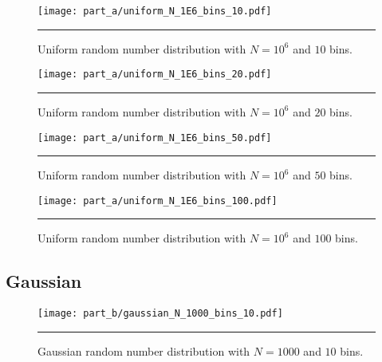 \documentclass[notitlepage,aps,prd,nofootinbib]{revtex4-1}
\begin{document}
\clearpage

\begin{figure}[!htbc]
  \centering
  \texttt{[image: part\_a/uniform\_N\_1E6\_bins\_10.pdf]}
	{\par\nobreak\rule[9pt]{35em}{0.5pt}\vspace{-5mm}}
	\caption{Uniform random number distribution with $N = 10^6$ and $10$ bins.}
	\label{fig:uniform_N_1E6_bins_10}
\end{figure}

\begin{figure}[!htbc]
  \centering
  \texttt{[image: part\_a/uniform\_N\_1E6\_bins\_20.pdf]}
	{\par\nobreak\rule[9pt]{35em}{0.5pt}\vspace{-5mm}}
	\caption{Uniform random number distribution with $N = 10^6$ and $20$ bins.}
	\label{fig:uniform_N_1E6_bins_20}
\end{figure}

\begin{figure}[!htbc]
  \centering
  \texttt{[image: part\_a/uniform\_N\_1E6\_bins\_50.pdf]}
	{\par\nobreak\rule[9pt]{35em}{0.5pt}\vspace{-5mm}}
	\caption{Uniform random number distribution with $N = 10^6$ and $50$ bins.}
	\label{fig:uniform_N_1E6_bins_50}
\end{figure}

\begin{figure}[!htbc]
  \centering
  \texttt{[image: part\_a/uniform\_N\_1E6\_bins\_100.pdf]}
	{\par\nobreak\rule[9pt]{35em}{0.5pt}\vspace{-5mm}}
	\caption{Uniform random number distribution with $N = 10^6$ and $100$ bins.}
	\label{fig:uniform_N_1E6_bins_100}
\end{figure}



\clearpage
\subsection{Gaussian}
\label{subsec:gaussian_results}

\begin{figure}[!htbc]
  \centering
  \texttt{[image: part\_b/gaussian\_N\_1000\_bins\_10.pdf]}
	{\par\nobreak\rule[9pt]{35em}{0.5pt}\vspace{-5mm}}
	\caption{Gaussian random number distribution with $N = 1000$ and $10$ bins.}
	\label{fig:gaussian_N_1000_bins_10}
\end{figure}
\end{document}
